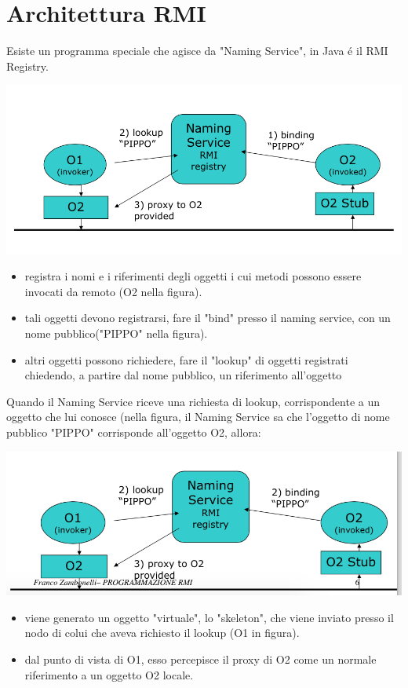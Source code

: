\documentclass[a4paper, 12 pt, italian]{report}
\begin{document}
\section{Architettura RMI}
Esiste un programma speciale che agisce da "Naming Service", in Java \'e il RMI Registry.


\includegraphics[]{schema1}




\begin{itemize}

\item registra i nomi e i riferimenti degli oggetti i cui metodi possono essere invocati da remoto (O2 nella figura).

\item tali oggetti devono registrarsi, fare il "bind" presso il naming service, con un nome pubblico("PIPPO" nella figura).

\item altri oggetti possono richiedere, fare il "lookup" di oggetti registrati chiedendo, a partire dal nome pubblico, un riferimento all'oggetto

\end{itemize}
Quando il Naming Service riceve una richiesta di lookup, corrispondente a un oggetto che lui conosce (nella figura, il Naming Service sa che l'oggetto di nome pubblico "PIPPO" corrisponde all'oggetto O2, allora:


\includegraphics[]{schema2}

\begin{itemize}

\item viene generato un oggetto "virtuale", lo "skeleton", che viene inviato presso il nodo di colui che aveva richiesto il lookup (O1 in figura).

\item dal punto di vista di O1, esso percepisce il proxy di O2 come un normale riferimento a un oggetto O2 locale.

\end{itemize}
\end{document}
